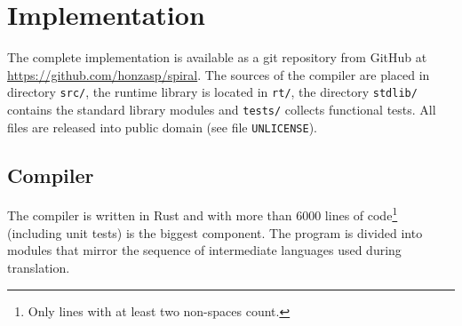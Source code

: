 \chapter{Implementation}

The complete implementation is available as a git repository from GitHub at
\url{https://github.com/honzasp/spiral}. The sources of the compiler are placed
in directory \texttt{src/}, the runtime library is located in \texttt{rt/}, the
directory \texttt{stdlib/} contains the standard library modules and
\texttt{tests/} collects functional tests. All files are released into public
domain (see file \texttt{UNLICENSE}).

\section{Compiler}

The compiler is written in Rust \cite{rust} and with more than 6000 lines of
code\footnote{Only lines with at least two non-spaces count.} (including unit
tests) is the biggest component. The program is divided into modules that
mirror the sequence of intermediate languages used during translation.

